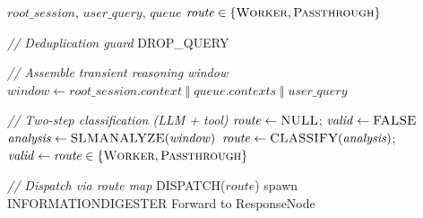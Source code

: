 \documentclass{article}
\begin{document}
\begin{algorithm}[t]
\caption{Query Analysis}
\label{alg:query-analyst}
\begin{algorithmic}[1]
\Require $\mathit{root\_session}$, $\mathit{user\_query}$, $\mathit{queue}$
\Ensure $\mathit{route} \in \{\textsc{Worker}, \textsc{Passthrough}\}$

\Statex \textit{// Deduplication guard}
    \State \Return DROP\_QUERY
\EndIf

\Statex \textit{// Assemble transient reasoning window}
\State $\mathit{window} \gets \mathit{root\_session}.\mathit{context} \;\Vert\; \mathit{queue}.\mathit{contexts} \;\Vert\; \mathit{user\_query}$

\Statex \textit{// Two-step classification (LLM + tool)}
\State $\mathit{route} \gets \textsc{NULL}$; $\mathit{valid} \gets \textsc{FALSE}$
    \State $\mathit{analysis} \gets \textsc{SLMANALYZE}(\mathit{window})$
    \State $\mathit{route} \gets \textsc{CLASSIFY}(\mathit{analysis})$; $\mathit{valid} \gets \mathit{route} \in \{\textsc{Worker}, \textsc{Passthrough}\}$
\EndWhile

\Statex \textit{// Dispatch via route map}
\State \textsc{DISPATCH}($\mathit{route}$)
    \State spawn \textsc{INFORMATIONDIGESTER}
    \State Forward to ResponseNode
\EndIf

\end{algorithmic}
\end{algorithm}
\end{document}
